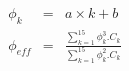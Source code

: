 \begin{eqnarray*}
\phi_k & = & a \times k + b \\
\phi_{eff} & = &  
\frac{\displaystyle\sum_{k=1}^{15} \phi_k^3.C_k} 
     {\displaystyle\sum_{k=1}^{15} \phi_k^2.C_k} \\
\end{eqnarray*}
